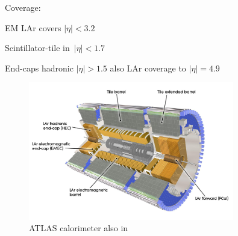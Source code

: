 
Coverage:

EM LAr covers $|\eta|< 3.2$

Scintillator-tile in~$|\eta| < 1.7$

End-caps hadronic $|\eta| > 1.5$ also LAr coverage to $|\eta| = 4.9$

\begin{figure}[ht]
  \centering
  \includegraphics[width=0.8\textwidth]{./figures/atlas/calorimeter.jpg}
  \caption{ATLAS calorimeter\cite{calo_fig} also in \cite{atlas_detector}}
  \label{fig:atlas_indet}
\end{figure}



